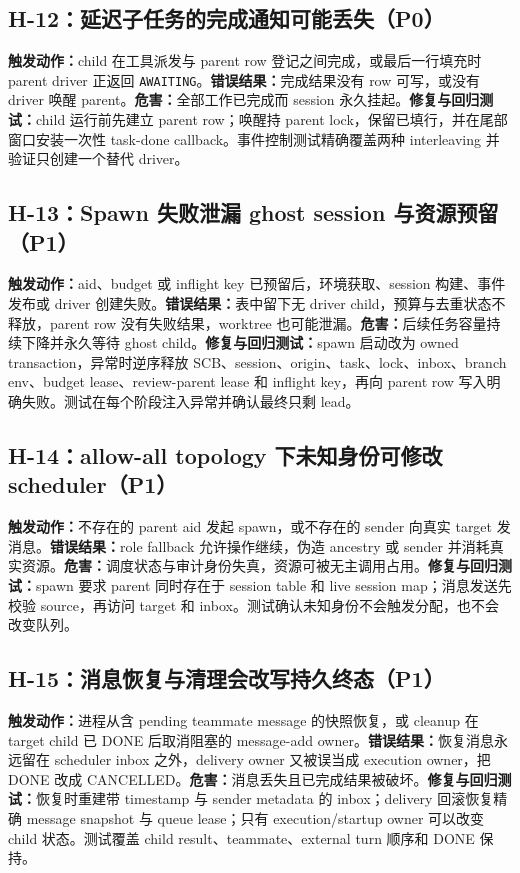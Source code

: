 \documentclass[11pt,a4paper,fontset=fandol]{ctexart}
\newcommand{\code}[1]{\texttt{#1}}
\begin{document}
\subsection{H-12：延迟子任务的完成通知可能丢失（P0）}

\textbf{触发动作：}child 在工具派发与 parent row 登记之间完成，或最后一行填充时 parent driver 正返回 \code{AWAITING}。\textbf{错误结果：}完成结果没有 row 可写，或没有 driver 唤醒 parent。\textbf{危害：}全部工作已完成而 session 永久挂起。\textbf{修复与回归测试：}child 运行前先建立 parent row；唤醒持 parent lock，保留已填行，并在尾部窗口安装一次性 task-done callback。事件控制测试精确覆盖两种 interleaving 并验证只创建一个替代 driver。

\subsection{H-13：Spawn 失败泄漏 ghost session 与资源预留（P1）}

\textbf{触发动作：}aid、budget 或 inflight key 已预留后，环境获取、session 构建、事件发布或 driver 创建失败。\textbf{错误结果：}表中留下无 driver child，预算与去重状态不释放，parent row 没有失败结果，worktree 也可能泄漏。\textbf{危害：}后续任务容量持续下降并永久等待 ghost child。\textbf{修复与回归测试：}spawn 启动改为 owned transaction，异常时逆序释放 SCB、session、origin、task、lock、inbox、branch env、budget lease、review-parent lease 和 inflight key，再向 parent row 写入明确失败。测试在每个阶段注入异常并确认最终只剩 lead。

\subsection{H-14：allow-all topology 下未知身份可修改 scheduler（P1）}

\textbf{触发动作：}不存在的 parent aid 发起 spawn，或不存在的 sender 向真实 target 发消息。\textbf{错误结果：}role fallback 允许操作继续，伪造 ancestry 或 sender 并消耗真实资源。\textbf{危害：}调度状态与审计身份失真，资源可被无主调用占用。\textbf{修复与回归测试：}spawn 要求 parent 同时存在于 session table 和 live session map；消息发送先校验 source，再访问 target 和 inbox。测试确认未知身份不会触发分配，也不会改变队列。

\subsection{H-15：消息恢复与清理会改写持久终态（P1）}

\textbf{触发动作：}进程从含 pending teammate message 的快照恢复，或 cleanup 在 target child 已 DONE 后取消阻塞的 message-add owner。\textbf{错误结果：}恢复消息永远留在 scheduler inbox 之外，delivery owner 又被误当成 execution owner，把 DONE 改成 CANCELLED。\textbf{危害：}消息丢失且已完成结果被破坏。\textbf{修复与回归测试：}恢复时重建带 timestamp 与 sender metadata 的 inbox；delivery 回滚恢复精确 message snapshot 与 queue lease；只有 execution/startup owner 可以改变 child 状态。测试覆盖 child result、teammate、external turn 顺序和 DONE 保持。
\end{document}
